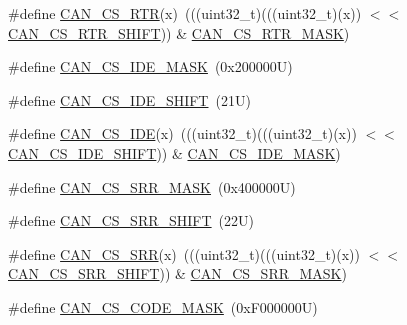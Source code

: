 \begin{DoxyCompactItemize}
\item 
\#define \mbox{\hyperlink{group___c_a_n___register___masks_gaa2b812f0853d2d9dc49ec4b48b70da96}{C\+A\+N\+\_\+\+C\+S\+\_\+\+R\+TR}}(x)~(((uint32\+\_\+t)(((uint32\+\_\+t)(x)) $<$$<$ \mbox{\hyperlink{group___c_a_n___register___masks_ga3298f7864757605895c4495c51d4f675}{C\+A\+N\+\_\+\+C\+S\+\_\+\+R\+T\+R\+\_\+\+S\+H\+I\+FT}})) \& \mbox{\hyperlink{group___c_a_n___register___masks_ga64cd76de04f63c4e897feab93243a4d1}{C\+A\+N\+\_\+\+C\+S\+\_\+\+R\+T\+R\+\_\+\+M\+A\+SK}})
\item 
\#define \mbox{\hyperlink{group___c_a_n___register___masks_ga8195b85087fd378777c67830ac2ca9fb}{C\+A\+N\+\_\+\+C\+S\+\_\+\+I\+D\+E\+\_\+\+M\+A\+SK}}~(0x200000\+U)
\item 
\#define \mbox{\hyperlink{group___c_a_n___register___masks_gae432768b4222f18cc1cec2b71ea8c579}{C\+A\+N\+\_\+\+C\+S\+\_\+\+I\+D\+E\+\_\+\+S\+H\+I\+FT}}~(21\+U)
\item 
\#define \mbox{\hyperlink{group___c_a_n___register___masks_ga0a2fc04326d66f35f6425b0f82253564}{C\+A\+N\+\_\+\+C\+S\+\_\+\+I\+DE}}(x)~(((uint32\+\_\+t)(((uint32\+\_\+t)(x)) $<$$<$ \mbox{\hyperlink{group___c_a_n___register___masks_gae432768b4222f18cc1cec2b71ea8c579}{C\+A\+N\+\_\+\+C\+S\+\_\+\+I\+D\+E\+\_\+\+S\+H\+I\+FT}})) \& \mbox{\hyperlink{group___c_a_n___register___masks_ga8195b85087fd378777c67830ac2ca9fb}{C\+A\+N\+\_\+\+C\+S\+\_\+\+I\+D\+E\+\_\+\+M\+A\+SK}})
\item 
\#define \mbox{\hyperlink{group___c_a_n___register___masks_gafd71067968d03b95e1dae32dc18ac578}{C\+A\+N\+\_\+\+C\+S\+\_\+\+S\+R\+R\+\_\+\+M\+A\+SK}}~(0x400000\+U)
\item 
\#define \mbox{\hyperlink{group___c_a_n___register___masks_ga77681ba56144cadb15bce536a1fd016d}{C\+A\+N\+\_\+\+C\+S\+\_\+\+S\+R\+R\+\_\+\+S\+H\+I\+FT}}~(22\+U)
\item 
\#define \mbox{\hyperlink{group___c_a_n___register___masks_ga0180e3f1a374f53c46a7d88fbbd0570f}{C\+A\+N\+\_\+\+C\+S\+\_\+\+S\+RR}}(x)~(((uint32\+\_\+t)(((uint32\+\_\+t)(x)) $<$$<$ \mbox{\hyperlink{group___c_a_n___register___masks_ga77681ba56144cadb15bce536a1fd016d}{C\+A\+N\+\_\+\+C\+S\+\_\+\+S\+R\+R\+\_\+\+S\+H\+I\+FT}})) \& \mbox{\hyperlink{group___c_a_n___register___masks_gafd71067968d03b95e1dae32dc18ac578}{C\+A\+N\+\_\+\+C\+S\+\_\+\+S\+R\+R\+\_\+\+M\+A\+SK}})
\item 
\#define \mbox{\hyperlink{group___c_a_n___register___masks_gadff04787b30174d22d7955037c850b7c}{C\+A\+N\+\_\+\+C\+S\+\_\+\+C\+O\+D\+E\+\_\+\+M\+A\+SK}}~(0x\+F000000\+U)
\item 
$$
\end{DoxyCompactItemize}

